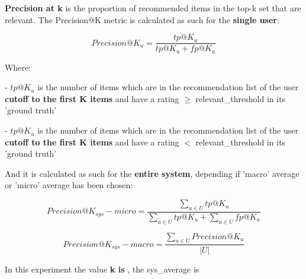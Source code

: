 \documentclass[12pt, a4paper]{article}
\begin{document}



\hfill\break
\textbf{Precision at k} is the proportion of recommended items in the top-k set that are relevant.
 The Precision@K metric is calculated as such for the \textbf{single user}:

    \[
    Precision@K_u = \frac{tp@K_u}{tp@K_u + fp@K_u}
    \]

    Where:

    - $tp@K_u$ is the number of items which are in the recommendation list  of the user
      \textbf{cutoff to the first K items} and have a rating $\geq$ relevant\_threshold in its 'ground truth'

    - $tp@K_u$ is the number of items which are in the recommendation list  of the user
      \textbf{cutoff to the first K items} and have a rating $<$ relevant\_threshold in its 'ground truth'

    And it is calculated as such for the \textbf{entire system}, depending if 'macro' average or 'micro' average has been
    chosen:

    \[
    Precision@K_{sys} - micro = \frac{\sum_{u \in U} tp@K_u}{\sum_{u \in U} tp@K_u + \sum_{u \in U} fp@K_u}
    \]

    \[
    Precision@K_{sys} - macro = \frac{\sum_{u \in U} Precision@K_u}{|U|}
    \]



In this experiment the value \textbf{k is },
the sys\_average is \textbf{}


\end{document}
